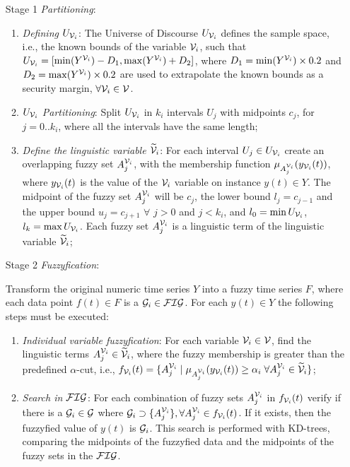 \begin{enumerate}
\item[Stage 1] \textit{Partitioning}:
\begin{enumerate}
\item \textit{Defining $U_{\mathcal{V}_i}$}: The Universe of Discourse $U_{\mathcal{V}_i}$ defines the sample space, i.e., the known bounds of the variable $\mathcal{V}_i$, such that $U_{\mathcal{V}_i} = [\min(Y^{\mathcal{V}_i})-D_1, \max(Y^{\mathcal{V}_i})+D_2]$, where $D_1 = \min(Y^{\mathcal{V}_i})\times 0.2$ and $D_2 = \max(Y^{\mathcal{V}_i})\times 0.2$ are used to extrapolate the known bounds as a security margin, $\forall \mathcal{V}_i \in \mathcal{V}$.

\item \textit{$U_{\mathcal{V}_i}$ Partitioning}: Split $U_{\mathcal{V}_i}$ in $k_i$ intervals $U_j$ with midpoints $c_j$, for $j=0..k_i$, where all the intervals have the same length;

\item \textit{Define the linguistic variable $\widetilde{\mathcal{V}}_i$}: For each interval $U_j \in U_{\mathcal{V}_i}$  create an overlapping fuzzy set $A_j^{\mathcal{V}_i}$, with the membership function $\mu_{A_j^{\mathcal{V}_i}}(y_{\mathcal{V}_i}(t))$, where $y_{\mathcal{V}_i}(t)$ is the value of the $\mathcal{V}_i$ variable on instance $y(t) \in Y$. The midpoint of the fuzzy set $A_j^{\mathcal{V}_i}$ will be $c_j$, the lower bound $l_j = c_{j-1}$ and the upper bound $u_j = c_{j+1}$ $\forall$ $j >0$ and $j < k_i$, and $l_0 = \min U_{\mathcal{V}_i}$, $l_k = \max U_{\mathcal{V}_i}$. Each fuzzy set $A_j^{\mathcal{V}_i}$ is a linguistic term of the linguistic variable $\widetilde{\mathcal{V}}_i$;

\end{enumerate}

\item[Stage 2] \textit{Fuzzyfication}: 

Transform the original numeric time series $Y$ into a fuzzy time series $F$, where each data point $f(t) \in F$ is a $\mathcal{G}_i \in \mathcal{FIG}$. For each $y(t) \in Y$ the following steps must be executed:

\begin{enumerate}
    \item \textit{Individual variable fuzzyfication}: For each variable $\mathcal{V}_i \in \mathcal{V}$, find the linguistic terms $A_j^{\mathcal{V}_i} \in \widetilde{\mathcal{V}}_i$, where the fuzzy membership is greater than the predefined $\alpha$-cut, i.e., $f_{\mathcal{V}_i}(t) = \{A_j^{\mathcal{V}_i}\; |\; \mu_{A_j^{\mathcal{V}_i}}(y_{\mathcal{V}_i}(t)) \geq \alpha_i\;\forall A_j^{\mathcal{V}_i} \in \widetilde{\mathcal{V}}_i\}$;
    
    \item \textit{Search in $\mathcal{FIG}$}: For each combination of fuzzy sets $A_j^{\mathcal{V}_i}$ in $f_{\mathcal{V}_i}(t)$ verify if there is a $\mathcal{G}_i \in \mathcal{G}$ where $\mathcal{G}_i \supset \{ A_j^{\mathcal{V}_i} \}, \forall A_j^{\mathcal{V}_i} \in f_{\mathcal{V}_i}(t)$. If it exists, then the fuzzyfied value of $y(t)$ is $\mathcal{G}_i$. This search is performed with KD-trees, comparing the midpoints of the fuzzyfied data and the midpoints of the fuzzy sets in the $\mathcal{FIG}$.
    

\end{enumerate}
\end{enumerate}

